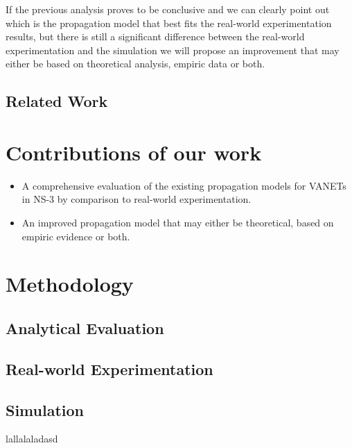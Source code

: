\documentclass[12pt]{article}
\begin{document}
If the previous analysis proves to be conclusive and we can clearly point out which is the propagation model that best fits the real-world experimentation results, but there is still a significant difference between the real-world experimentation and the simulation we will propose an improvement that may either be based on theoretical analysis, empiric data or both.

\subsection{Related Work}

\section{Contributions of our work}
\begin{itemize}
	\item A comprehensive evaluation of the existing propagation models for VANETs in NS-3 by comparison to real-world experimentation.
	\item An improved propagation model that may either be theoretical, based on empiric evidence or both.
\end{itemize}
\section{Methodology}

\subsection{Analytical Evaluation}

\subsection{Real-world Experimentation}

\subsection{Simulation}
lallalaladasd
\end{document}
